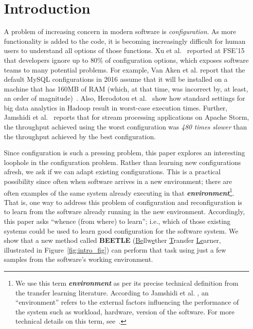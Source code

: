 \documentclass[10pt,journal,compsoc]{IEEEtran}
\newcommand{\fig}[1]{Figure~\ref{fig:#1}}
\begin{document}
\section{Introduction} 
A problem of increasing concern in modern software is {\em configuration}.
As more  functionality
is added to the code, it is becoming increasingly difficult for human users to understand all options of those functions.
Xu et al.~\cite{xu2015hey} reported at FSE'15  that developers  ignore up 
to  80\% of configuration options, which exposes
software teams to many potential problems.
For example, Van Aken et al. report that the default MySQL configurations in 2016 assume that it will be installed on a machine that has  160MB of RAM (which, at that time, was incorrect by, at least, an order of magnitude)~\cite{van2017automatic}. Also,
Herodotou et al.~\cite{herodotou2011starfish} show how standard settings for big data analytics in Hadoop result in worst-case execution times. Further, Jamshidi et al.~\cite{JC:MASCOTS16} reports that for
stream processing applications on Apache Storm, the throughput achieved using the worst configuration was 
{\em 480 times slower} than the throughput achieved by the best configuration.

Since configuration is such a pressing problem,
this paper explores an interesting loophole in the configuration problem. Rather than learning new configurations afresh, we ask if we can adapt existing
configurations. This is a practical possibility since often when software arrives in a new environment; there are often examples of the same system
already executing in that \textbf{\textit{environment}}\footnote{We use
this term {\bf \textit{environment}} as per its precise technical definition from the transfer learning literature. According to
Jamshidi et al. \cite{jamshidi2017transfer2},
an ``environment'' refers to the external factors influencing the performance of the system such as workload, hardware, version of the software. For more technical details on this term, see~.}. That is, 
one way to address this problem of configuration and reconfiguration is to learn from the software already running in the new environment. Accordingly, this paper asks ``whence (from where) to learn''; i.e., which of those existing systems could be used to learn good configuration for the software system.
We show  that a new method called 
\textbf{BEETLE} (\underline{Be}llw\underline{e}ther \underline{T}ransfer \underline{Le}arner, illustrated in \fig{intro_fig}) can perform that task using just a few samples from the software's working environment.
\end{document}
